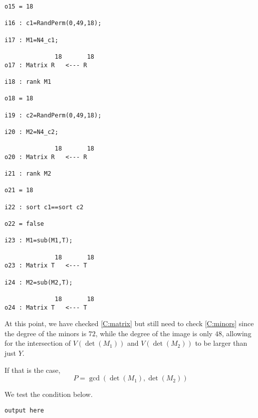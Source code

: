 \documentclass[fleqn,reqno]{amsart}
\numberwithin{first}{chapter}
\begin{document}
\begin{example}[$\mt{ex603}$]
\begin{verbatim}
o15 = 18

i16 : c1=RandPerm(0,49,18);

i17 : M1=N4_c1;

              18       18
o17 : Matrix R   <--- R

i18 : rank M1

o18 = 18

i19 : c2=RandPerm(0,49,18);

i20 : M2=N4_c2;

              18       18
o20 : Matrix R   <--- R

i21 : rank M2

o21 = 18

i22 : sort c1==sort c2

o22 = false

i23 : M1=sub(M1,T);

              18       18
o23 : Matrix T   <--- T

i24 : M2=sub(M2,T);

              18       18
o24 : Matrix T   <--- T
\end{verbatim}
At this point, we have checked \eqref{C:matrix} but still need to check \eqref{C:minors}
since the degree of the minors is $72$,
while the degree of the image is only $48$,
allowing for the intersection of $V(\det(M_1))$ and $V(\det(M_2))$
to be larger than just $Y$.

If that is the case,
\[
	P=\gcd(\det(M_1),\det(M_2))
\]

We test the condition below.
\begin{verbatim}
output here
\end{verbatim}
\end{example}



\end{document}

